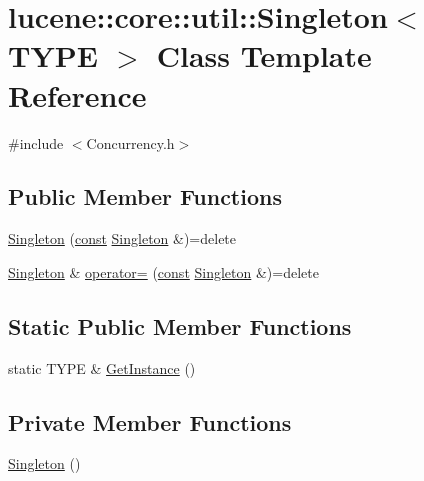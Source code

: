 \hypertarget{classlucene_1_1core_1_1util_1_1Singleton}{}\section{lucene\+:\+:core\+:\+:util\+:\+:Singleton$<$ T\+Y\+PE $>$ Class Template Reference}
\label{classlucene_1_1core_1_1util_1_1Singleton}


{\ttfamily \#include $<$Concurrency.\+h$>$}

\subsection*{Public Member Functions}
\begin{DoxyCompactItemize}
\item 
\mbox{\hyperlink{classlucene_1_1core_1_1util_1_1Singleton_ab5733f8687076b2ce608b096f91f5237}{Singleton}} (\mbox{\hyperlink{ZlibCrc32_8h_a2c212835823e3c54a8ab6d95c652660e}{const}} \mbox{\hyperlink{classlucene_1_1core_1_1util_1_1Singleton}{Singleton}} \&)=delete
\item 
\mbox{\hyperlink{classlucene_1_1core_1_1util_1_1Singleton}{Singleton}} \& \mbox{\hyperlink{classlucene_1_1core_1_1util_1_1Singleton_abec7d88a0f754dfa66438cc76e4c5fd5}{operator=}} (\mbox{\hyperlink{ZlibCrc32_8h_a2c212835823e3c54a8ab6d95c652660e}{const}} \mbox{\hyperlink{classlucene_1_1core_1_1util_1_1Singleton}{Singleton}} \&)=delete
\end{DoxyCompactItemize}
\subsection*{Static Public Member Functions}
\begin{DoxyCompactItemize}
\item 
static T\+Y\+PE \& \mbox{\hyperlink{classlucene_1_1core_1_1util_1_1Singleton_a5e8079ebbaae97438a52c449ee92aafa}{Get\+Instance}} ()
\end{DoxyCompactItemize}
\subsection*{Private Member Functions}
\begin{DoxyCompactItemize}
\item 
\mbox{\hyperlink{classlucene_1_1core_1_1util_1_1Singleton_a53448fc36821fec1c97716535987eaa7}{Singleton}} ()
\end{DoxyCompactItemize}


